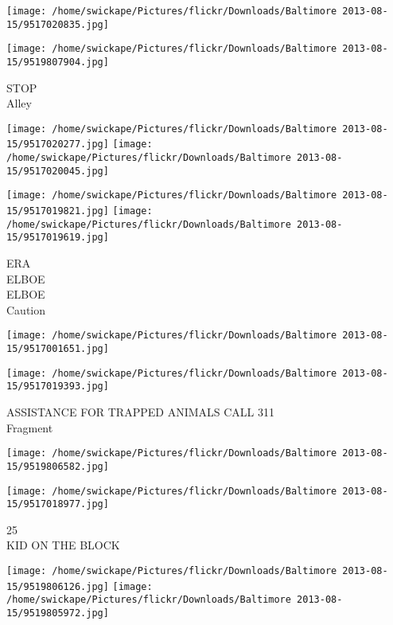 \documentclass[10pt,letterpaper]{article}
\begin{document}
\texttt{[image: /home/swickape/Pictures/flickr/Downloads/Baltimore 2013-08-15/9517020835.jpg]}

\vspace{0.25in}
\texttt{[image: /home/swickape/Pictures/flickr/Downloads/Baltimore 2013-08-15/9519807904.jpg]}

STOP\\
Alley\\
\pagebreak

\texttt{[image: /home/swickape/Pictures/flickr/Downloads/Baltimore 2013-08-15/9517020277.jpg]}
\texttt{[image: /home/swickape/Pictures/flickr/Downloads/Baltimore 2013-08-15/9517020045.jpg]}

\texttt{[image: /home/swickape/Pictures/flickr/Downloads/Baltimore 2013-08-15/9517019821.jpg]}
\texttt{[image: /home/swickape/Pictures/flickr/Downloads/Baltimore 2013-08-15/9517019619.jpg]}

ERA\\
ELBOE\\
ELBOE\\
Caution\\
\pagebreak

\texttt{[image: /home/swickape/Pictures/flickr/Downloads/Baltimore 2013-08-15/9517001651.jpg]}

\vspace{0.25in}
\texttt{[image: /home/swickape/Pictures/flickr/Downloads/Baltimore 2013-08-15/9517019393.jpg]}

ASSISTANCE FOR TRAPPED ANIMALS CALL 311\\
Fragment\\
\pagebreak

\texttt{[image: /home/swickape/Pictures/flickr/Downloads/Baltimore 2013-08-15/9519806582.jpg]}

\vspace{0.25in}
\texttt{[image: /home/swickape/Pictures/flickr/Downloads/Baltimore 2013-08-15/9517018977.jpg]}

25\\
KID ON THE BLOCK\\
\pagebreak

\texttt{[image: /home/swickape/Pictures/flickr/Downloads/Baltimore 2013-08-15/9519806126.jpg]}
\texttt{[image: /home/swickape/Pictures/flickr/Downloads/Baltimore 2013-08-15/9519805972.jpg]}
\end{document}
